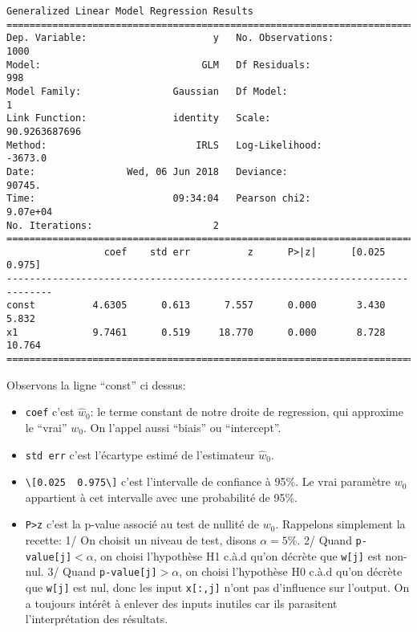 \documentclass[11pt]{article}
\providecommand{\tightlist}{%
      \setlength{\itemsep}{0pt}\setlength{\parskip}{0pt}}
\begin{document}
    \begin{Verbatim}[commandchars=\\\{\}]
                 Generalized Linear Model Regression Results                  
==============================================================================
Dep. Variable:                      y   No. Observations:                 1000
Model:                            GLM   Df Residuals:                      998
Model Family:                Gaussian   Df Model:                            1
Link Function:               identity   Scale:                   90.9263687696
Method:                          IRLS   Log-Likelihood:                -3673.0
Date:                Wed, 06 Jun 2018   Deviance:                       90745.
Time:                        09:34:04   Pearson chi2:                 9.07e+04
No. Iterations:                     2                                         
==============================================================================
                 coef    std err          z      P>|z|      [0.025      0.975]
------------------------------------------------------------------------------
const          4.6305      0.613      7.557      0.000       3.430       5.832
x1             9.7461      0.519     18.770      0.000       8.728      10.764
==============================================================================

    \end{Verbatim}

    Observons la ligne ``const'' ci dessus:

\begin{itemize}
\tightlist
\item
  \texttt{coef} c'est \(\hat w_0\): le terme constant de notre droite de
  regression, qui approxime le ``vrai'' \(w_0\). On l'appel aussi
  ``biais'' ou ``intercept''.
\item
  \texttt{std\ err} c'est l'écartype estimé de l'estimateur
  \(\hat w_0\).
\item
  \texttt{\textbackslash{}{[}0.025\ \ 0.975\textbackslash{}{]}} c'est
  l'intervalle de confiance à 95\%. Le vrai paramètre \(w_0\) appartient
  à cet intervalle avec une probabilité de 95\%.
\item
  \texttt{P\textgreater{}\textbar{}z\textbar{}} c'est la p-value associé
  au test de nullité de \(w_0\). Rappelons simplement la recette: 1/ On
  choisit un niveau de test, disons \(\alpha=5\%\). 2/ Quand
  \texttt{p-value{[}j{]}}\(<\alpha\), on choisi l'hypothèse H1 c.à.d
  qu'on décrète que \texttt{w{[}j{]}} est non-nul. 3/ Quand
  \texttt{p-value{[}j{]}}\(>\alpha\), on choisi l'hypothèse H0 c.à.d
  qu'on décrète que \texttt{w{[}j{]}} est nul, donc les input
  \texttt{x{[}:,j{]}} n'ont pas d'influence sur l'output. On a toujours
  intérêt à enlever des inputs inutiles car ils parasitent
  l'interprétation des résultats.
\end{itemize}
\end{document}
